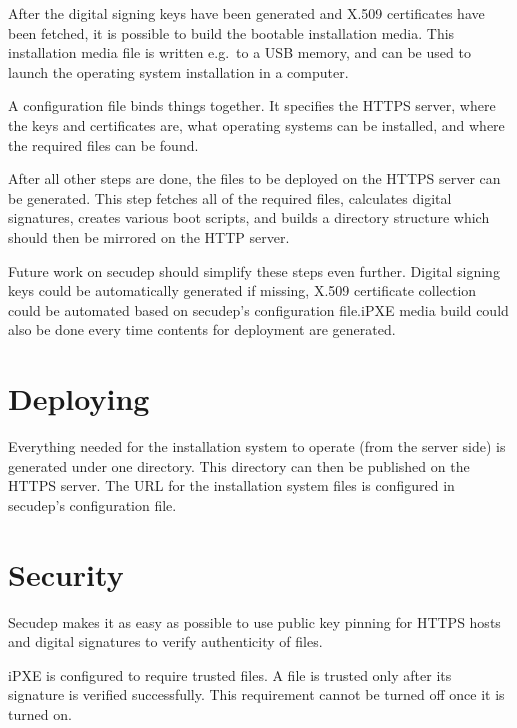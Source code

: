 After the digital signing keys have been generated and X.509
certificates have been fetched, it is possible to build the bootable
installation media. This installation media file is written e.g.\ to a
USB memory, and can be used to launch the operating system
installation in a computer.

A configuration file binds things together. It specifies the HTTPS
server, where the keys and certificates are, what operating systems
can be installed, and where the required files can be found.

After all other steps are done, the files to be deployed on the HTTPS
server can be generated. This step fetches all of the required files,
calculates digital signatures, creates various boot scripts, and
builds a directory structure which should then be mirrored on the HTTP
server.

Future work on secudep should simplify these steps even further.
Digital signing keys could be automatically generated if missing,
X.509 certificate collection could be automated based on secudep's
configuration file.\@ iPXE media build could also be done every time
contents for deployment are generated.

\section{Deploying}

Everything needed for the installation system to operate (from the
server side) is generated under one directory. This directory can then
be published on the HTTPS server. The URL for the installation system
files is configured in secudep's configuration file.

\section{Security}

Secudep makes it as easy as possible to use public key pinning for
HTTPS hosts and digital signatures to verify authenticity of files.

iPXE is configured to require trusted files. A file is trusted only
after its signature is verified successfully. This requirement cannot
be turned off once it is turned on.
